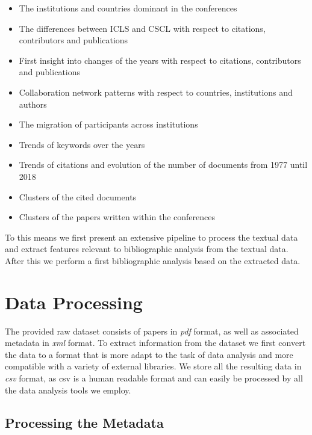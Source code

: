 \documentclass[journal,twocolumn]{IEEEtran}
\providecommand{\tightlist}{%
      \setlength{\itemsep}{0pt}\setlength{\parskip}{0pt}}
\begin{document}
\begin{itemize}
\tightlist
\item
  The institutions and countries dominant in the conferences
\item
  The differences between ICLS and CSCL with respect to citations,
  contributors and publications
\item
  First insight into changes of the years with respect to citations,
  contributors and publications
\item
  Collaboration network patterns with respect to countries, institutions
  and authors
\item
  The migration of participants across institutions
\item
  Trends of keywords over the years
\item
  Trends of citations and evolution of the number of documents from 1977
  until 2018
\item
  Clusters of the cited documents
\item
  Clusters of the papers written within the conferences
\end{itemize}

To this means we first present an extensive pipeline to process the
textual data and extract features relevant to bibliographic analysis
from the textual data. After this we perform a first bibliographic
analysis based on the extracted data.

    \hypertarget{data-processing}{%
\section{Data Processing}\label{data-processing}}

    The provided raw dataset consists of papers in \emph{pdf} format, as
well as associated metadata in \emph{xml} format. To extract information
from the dataset we first convert the data to a format that is more
adapt to the task of data analysis and more compatible with a variety of
external libraries. We store all the resulting data in \emph{csv}
format, as csv is a human readable format and can easily be processed by
all the data analysis tools we employ.

    \hypertarget{processing-the-metadata}{%
\subsection{Processing the Metadata}\label{processing-the-metadata}}
\end{document}
